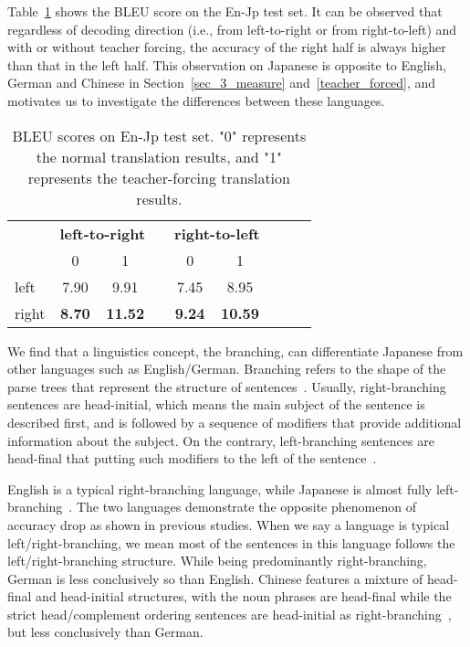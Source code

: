 \documentclass[11pt,a4paper]{article}
\begin{document}
Table~\ref{no_feed_jp} shows the BLEU score on the En-Jp test set. It can be observed that regardless of decoding direction (i.e., from left-to-right or from right-to-left) and with or without teacher forcing, the accuracy of the right half is always higher than that in the left half. This observation on Japanese is opposite to English, German and Chinese in Section~\ref{sec_3_measure} and~\ref{teacher_forced}, and motivates us to investigate the differences between these languages.


\begin{table}[!tbp]
\small
\centering %
\begin{tabular}{ l  c  c  c  c  c  c  c  c  } %
\toprule
& \multicolumn{2}{c}{\textbf{left-to-right}} & & \multicolumn{2}{c}{\textbf{right-to-left}}  \\
\cmidrule{2-3}  \cmidrule{5-6}
  & 0 & 1 & & 0 & 1  \\
\midrule
left & 7.90 & 9.91 & & 7.45 & 8.95   \\
right & \textbf{8.70} & \textbf{11.52} & & \textbf{9.24} & \textbf{10.59} \\
\bottomrule
\end{tabular}
\caption{BLEU scores on En-Jp test set. "0" represents the normal translation results, and "1" represents the teacher-forcing translation results.}
\label{no_feed_jp}
\end{table}

We find that a linguistics concept, the branching, can differentiate Japanese from other languages such as English/German. Branching refers to the shape of the parse trees that represent the structure of sentences~\cite{berg2011structure,payne2006exploring}. Usually, right-branching sentences are head-initial, which means the main subject of the sentence is described first, and is followed by a sequence of modifiers that provide additional information about the subject. On the contrary, left-branching sentences are head-final that putting such modifiers to the left of the sentence~\cite{payne2006exploring}.

English is a typical right-branching language, while Japanese is almost fully left-branching~\cite{wiki:Head-directionality_parameter}. The two languages demonstrate the opposite phenomenon of accuracy drop  as shown in previous studies. When we say a language is typical left/right-branching, we mean most of the sentences in this language follows the left/right-branching structure. While being predominantly right-branching, German is less conclusively so than English. Chinese features a mixture of head-final and head-initial structures, with the noun phrases are head-final while the strict head/complement ordering sentences are head-initial as right-branching~\cite{wiki:Head-directionality_parameter}, but less conclusively than German.
\end{document}
